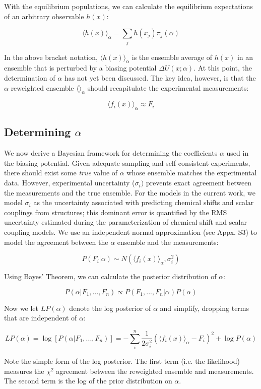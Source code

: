 \documentclass[11pt,titlepage]{article}
\begin{document}
With the equilibrium populations, we can calculate the equilibrium expectations of an arbitrary observable $h(x)$:

$$\langle h(x)\rangle _\alpha = \sum_j h(x_j) \pi_j(\alpha)$$

In the above bracket notation, $\langle h(x)\rangle _\alpha$ is the ensemble average of $h(x)$ in an ensemble that is perturbed by a biasing potential $\Delta U(x;\alpha)$.  At this point, the determination of $\alpha$ has not yet been discussed.  The key idea, however, is that the $\alpha$ reweighted ensemble $\langle \rangle _\alpha$ should recapitulate the experimental measurements:

$$\langle f_i(x)\rangle _\alpha \approx F_i$$


\subsection*{Determining $\alpha$}

We now derive a Bayesian framework for determining the coefficients $\alpha$ used in the biasing potential.  Given adequate sampling and self-consistent experiments, there should exist some \emph{true} value of $\alpha$ whose ensemble matches the experimental data.  However, experimental uncertainty ($\sigma_i)$ prevents exact agreement between the measurements and the true ensemble.  For the models in the current work, we model $\sigma_i$ as the uncertainty associated with predicting chemical shifts and scalar couplings from structures; this dominant error is quantified by the RMS uncertainty estimated during the parameterization of chemical shift and scalar coupling models.  We use an independent normal approximation (see Appx. S3) to model the agreement between the $\alpha$ ensemble and the measurements:

$$P(F_i | \alpha) \sim N(\langle f_i(x)\rangle _\alpha, \sigma_i^2)$$

Using Bayes' Theorem, we can calculate the posterior distribution of $\alpha$:

$$P(\alpha | F_1, ..., F_n) \propto P(F_1, ..., F_n | \alpha) P(\alpha)$$

Now we let $LP(\alpha)$ denote the log posterior of $\alpha$ and simplify, dropping terms that are independent of $\alpha$:

$$LP(\alpha) = \log[ P(\alpha|F_1, ..., F_n)] = -\sum_i^n \frac{1}{2\sigma_i^2}(\langle f_i(x)\rangle _\alpha - F_i)^2 + \log P(\alpha)$$

Note the simple form of the log posterior.  The first term (i.e. the likelihood) measures the $\chi^2$ agreement between the reweighted ensemble and measurements.  The second term is the log of the prior distribution on $\alpha$.  
\end{document}

